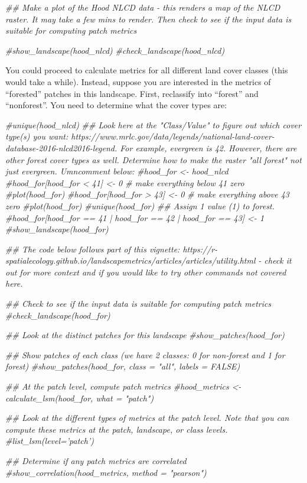 \documentclass[
]{article}
\newenvironment{Shaded}{\begin{snugshade}}{\end{snugshade}}
\newcommand{\CommentTok}[1]{\textcolor[rgb]{0.56,0.35,0.01}{\textit{#1}}}
\begin{document}
\begin{Shaded}
\begin{Highlighting}[]
\CommentTok{## Make a plot of the Hood NLCD data - this renders a map of the NLCD raster. It may take a few mins to render. Then check to see if the input data is suitable for computing patch metrics}
 
\CommentTok{#show_landscape(hood_nlcd)}
\CommentTok{#check_landscape(hood_nlcd)}
\end{Highlighting}
\end{Shaded}

You could proceed to calculate metrics for all different land cover
classes (this would take a while). Instead, suppose you are interested
in the metrics of ``forested'' patches in this landscape. First,
reclassify into ``forest'' and ``nonforest''. You need to determine what
the cover types are:

\begin{Shaded}
\begin{Highlighting}[]
\CommentTok{#unique(hood_nlcd)}
\CommentTok{## Look here at the "Class/Value" to figure out which cover type(s) you want: https://www.mrlc.gov/data/legends/national-land-cover-database-2016-nlcd2016-legend. For example, evergreen is 42. However, there are other forest cover types as well. Determine how to make the raster "all forest" not just evergreen. Umncomment below:}
\CommentTok{#hood_for <- hood_nlcd}
\CommentTok{#hood_for[hood_for < 41] <- 0 # make everything below 41 zero}
\CommentTok{#plot(hood_for)}
\CommentTok{#hood_for[hood_for > 43] <- 0 # make everything above 43 zero}
\CommentTok{#plot(hood_for)}
\CommentTok{#unique(hood_for)}
\CommentTok{## Assign 1 value (1) to forest.}
\CommentTok{#hood_for[hood_for == 41 | hood_for == 42 | hood_for == 43] <- 1}
\CommentTok{#show_landscape(hood_for)}

\CommentTok{## The code below follows part of this vignette: https://r-spatialecology.github.io/landscapemetrics/articles/articles/utility.html - check it out for more context and if you would like to try other commands not covered here.}

\CommentTok{## Check to see if the input data is suitable for computing patch metrics}
\CommentTok{#check_landscape(hood_for)}

\CommentTok{## Look at the distinct patches for this landscape}
\CommentTok{#show_patches(hood_for) }

\CommentTok{## Show patches of each class (we have 2 classes: 0 for non-forest and 1 for forest)}
\CommentTok{#show_patches(hood_for, class = "all", labels = FALSE)}

\CommentTok{## At the patch level, compute patch metrics}
\CommentTok{#hood_metrics <- calculate_lsm(hood_for, what = "patch")}

\CommentTok{## Look at the different types of metrics at the patch level. Note that you can compute these metrics at the patch, landscape, or class levels.}
\CommentTok{#list_lsm(level='patch')}

\CommentTok{## Determine if any patch metrics are correlated}
\CommentTok{#show_correlation(hood_metrics, method = "pearson")}
\end{Highlighting}
\end{Shaded}
\end{document}
